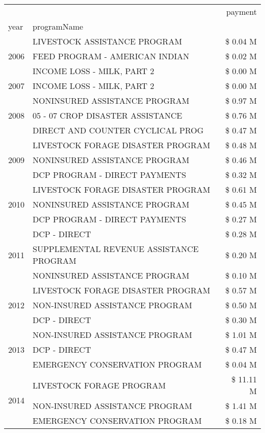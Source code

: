 \begin{tabular}{llr}
\toprule
 &  & payment \\
year & programName &  \\
\midrule
\multirow[t]{3}{*}{2006} & LIVESTOCK ASSISTANCE PROGRAM & \$ 0.04 M \\
 & FEED PROGRAM - AMERICAN INDIAN & \$ 0.02 M \\
 & INCOME LOSS - MILK, PART 2 & \$ 0.00 M \\
\cline{1-3}
2007 & INCOME LOSS - MILK, PART 2 & \$ 0.00 M \\
\cline{1-3}
\multirow[t]{3}{*}{2008} & NONINSURED ASSISTANCE PROGRAM & \$ 0.97 M \\
 & 05 - 07 CROP DISASTER ASSISTANCE & \$ 0.76 M \\
 & DIRECT AND COUNTER CYCLICAL PROG & \$ 0.47 M \\
\cline{1-3}
\multirow[t]{3}{*}{2009} & LIVESTOCK FORAGE DISASTER  PROGRAM & \$ 0.48 M \\
 & NONINSURED ASSISTANCE PROGRAM & \$ 0.46 M \\
 & DCP PROGRAM - DIRECT PAYMENTS & \$ 0.32 M \\
\cline{1-3}
\multirow[t]{3}{*}{2010} & LIVESTOCK FORAGE DISASTER  PROGRAM & \$ 0.61 M \\
 & NONINSURED ASSISTANCE PROGRAM & \$ 0.45 M \\
 & DCP PROGRAM - DIRECT PAYMENTS & \$ 0.27 M \\
\cline{1-3}
\multirow[t]{3}{*}{2011} & DCP - DIRECT & \$ 0.28 M \\
 & SUPPLEMENTAL REVENUE ASSISTANCE PROGRAM & \$ 0.20 M \\
 & NONINSURED ASSISTANCE PROGRAM & \$ 0.10 M \\
\cline{1-3}
\multirow[t]{3}{*}{2012} & LIVESTOCK FORAGE DISASTER PROGRAM & \$ 0.57 M \\
 & NON-INSURED ASSISTANCE PROGRAM & \$ 0.50 M \\
 & DCP - DIRECT & \$ 0.30 M \\
\cline{1-3}
\multirow[t]{3}{*}{2013} & NON-INSURED ASSISTANCE PROGRAM & \$ 1.01 M \\
 & DCP - DIRECT & \$ 0.47 M \\
 & EMERGENCY CONSERVATION PROGRAM & \$ 0.04 M \\
\cline{1-3}
\multirow[t]{3}{*}{2014} & LIVESTOCK FORAGE PROGRAM & \$ 11.11 M \\
 & NON-INSURED ASSISTANCE PROGRAM & \$ 1.41 M \\
 & EMERGENCY CONSERVATION PROGRAM & \$ 0.18 M \\

\end{tabular}
